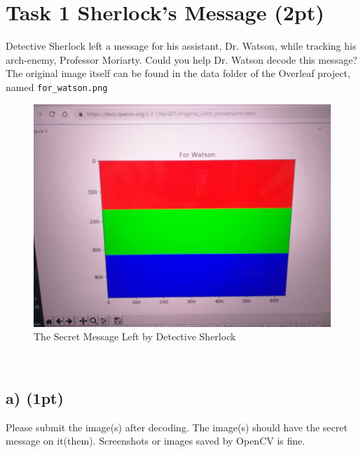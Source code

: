 \documentclass[english]{article}
\begin{document}
\tableofcontents
\clearpage

\section{Task 1 Sherlock’s Message (2pt)}
Detective Sherlock left a message for his assistant, Dr. Watson, while tracking his arch-enemy, Professor Moriarty. Could you help Dr. Watson decode this message? The original image itself can be found in the data folder of the Overleaf project, named \texttt{for\_watson.png}
\begin{figure}[h!]
    \centering
    \includegraphics[scale = 0.4]{figs/screenshot.png}

    \caption{The Secret Message Left by Detective Sherlock}
    \label{fig:for_watson}
\end{figure}\\

\subsection{a) (1pt)}
Please submit the image(s) after decoding. The image(s) should have the secret message on it(them). Screenshots or images saved by OpenCV is fine.
\end{document}
